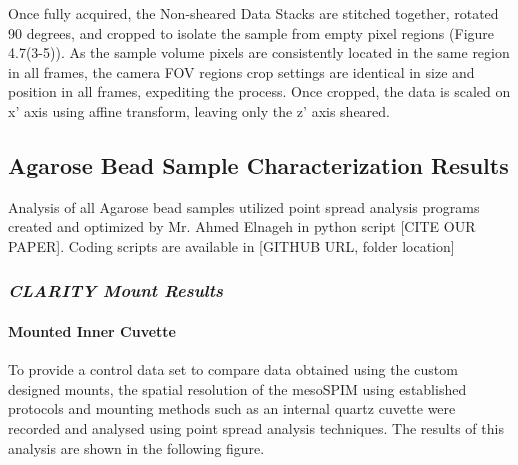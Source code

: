  Once fully acquired, the Non-sheared Data Stacks are stitched together, rotated 90 degrees, and cropped to isolate the sample from empty pixel regions (Figure 4.7(3-5)). As the sample volume pixels are consistently located in the same region in all frames, the camera FOV regions crop settings are identical in size and position in all frames, expediting the process. Once cropped, the data is scaled on x' axis using affine transform, leaving only the z' axis sheared.

\subsection{Agarose Bead Sample Characterization Results}

Analysis of all Agarose bead samples utilized point spread analysis programs created and optimized by Mr. Ahmed Elnageh in python script [CITE OUR PAPER]. Coding scripts are available in [GITHUB URL, folder location]

\subsubsection{\textit{CLARITY Mount Results}}
\paragraph{Mounted Inner Cuvette}
To provide a control data set to compare data obtained using the custom designed mounts, the spatial resolution of the mesoSPIM using established protocols and mounting methods such as an internal quartz cuvette were recorded and analysed using point spread analysis techniques. The results of this analysis are shown in the following figure.

